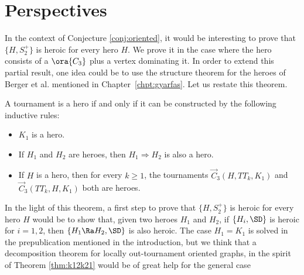 \section{Perspectives}
In the context of Conjecture  \ref{conj:oriented}, it would be interesting to prove that $\{  H, S^+_2\}$ is heroic for every hero $H$. 
We prove it in the case where the hero consists of a $\ora{C_3}$ plus a vertex dominating it. In order to extend this partial result, one idea could be to use the structure theorem for the heroes of Berger et al. mentioned in Chapter~\ref{chpt:gyarfas}. Let us restate this theorem.



\begin{theorem}\label{thm:hero}
A tournament is a hero if and only if it can be constructed by the following inductive rules:
\begin{itemize}
	\item $K_1$ is a hero.
	\item If $H_1$ and $H_2$ are heroes, then $H_1 \Rightarrow H_2$ is also a hero.
	\item If $H$ is a hero, then for every $k \ge 1$, the tournaments $\vec C_{3}(H, TT_k, K_1)$ and $\vec C_{3}(TT_k, H, K_1)$ both are heroes. 
\end{itemize}

\end{theorem}

In the light of this theorem, a first step to prove that $\{  H, S^+_2\}$ is heroic for every hero $H$ would be to show that, given two heroes $H_1$ and $H_2$, if $\{  H_i, \SD\}$ is heroic for $i=1,2$, then $\{  H_1\Ra H_2, \SD\}$ is also heroic. 
The case $H_1=K_1$ is solved in the prepublication \cite{S21} mentioned in the introduction, but we think that  a decomposition theorem for locally out-tournament oriented graphs, in the spirit of Theorem \ref{thm:k12k21} would  be of great help for the general case



